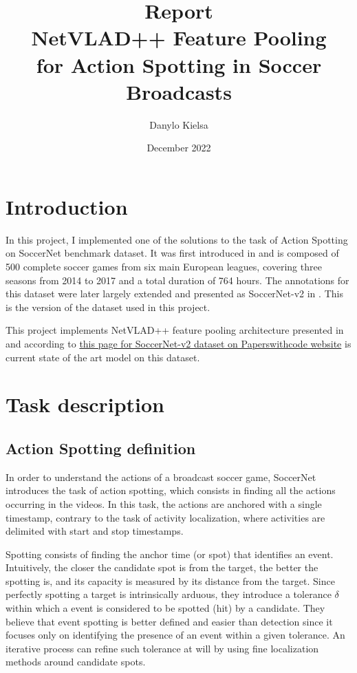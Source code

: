 \documentclass{article}
\title{Report\\
        NetVLAD++ Feature Pooling \\
        for Action Spotting in Soccer Broadcasts}
\author{Danylo Kielsa}
\date{December 2022}
\begin{document}
\maketitle

\section{Introduction}
In this project, I implemented one of the solutions to the task of Action Spotting on SoccerNet benchmark dataset. It was first introduced in \cite{sn-v1} and is composed of 500 complete soccer games from six main European leagues, covering three seasons from 2014 to 2017 and a total duration of 764 hours. The annotations for this dataset were later largely extended and presented as SoccerNet-v2 in \cite{sn-v2}. This is the version of the dataset used in this project. 

This project implements NetVLAD++ feature pooling architecture presented in \cite{nv++} and according to \href{https://paperswithcode.com/sota/action-spotting-on-soccernet-v2}{this page for SoccerNet-v2 dataset on Paperswithcode website} is current state of the art model on this dataset. 

\section{Task description}
\subsection{Action Spotting definition}
In order to understand the actions of a broadcast soccer game, SoccerNet introduces the
task of action spotting, which consists in finding all the actions occurring in the videos. In this task, the actions are anchored with a single timestamp, contrary to the task of activity localization, where activities are delimited with start and stop timestamps.

Spotting consists of finding the anchor time (or spot) that identifies an event. Intuitively, the closer the candidate spot is from the target, the better the spotting is, and its capacity is measured by its distance from the target. Since perfectly spotting a target is intrinsically arduous, they introduce a tolerance $\delta$ within which a event is considered to be spotted (hit) by a candidate. They believe that event spotting is better defined and easier than detection since it focuses only on identifying the presence of an event within a given tolerance. An iterative process can refine such tolerance at will by using fine localization methods around candidate spots.
\end{document}
